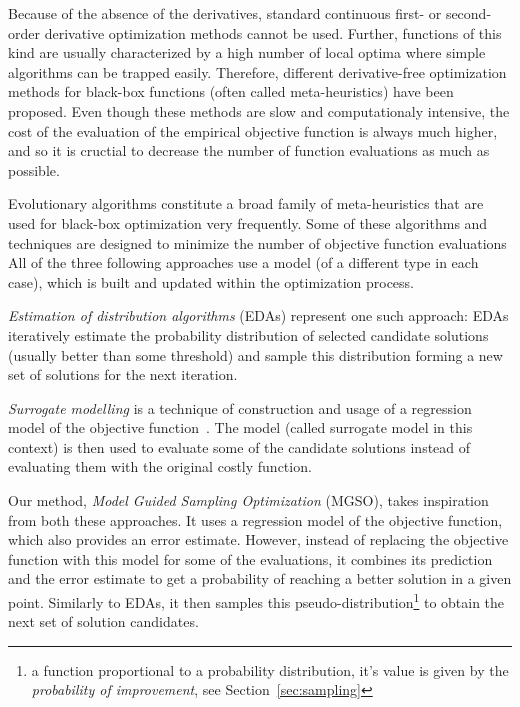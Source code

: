 \documentclass{itatnew}
\begin{document}
Because of the absence of the derivatives, standard continuous first- or second-order derivative optimization methods cannot be used. Further, functions of this kind are usually characterized by a high number of local optima where simple algorithms can be trapped easily. Therefore, different derivative-free optimization methods for black-box functions (often called meta-heuristics) have been proposed. Even though these methods are slow and computationaly intensive, the cost of the evaluation of the empirical objective function is always much higher, and so it is cructial to decrease the number of function evaluations as much as possible.

Evolutionary algorithms constitute a broad family of meta-heuristics that are used for black-box optimization very frequently. Some of these algorithms and techniques are designed to minimize the number of objective function evaluations 
All of the three following approaches use a model (of a different type in each case), which is built and updated within the optimization process.

\emph{Estimation of distribution algorithms} (EDAs) \cite{larranaga_estimation_2002} represent one such approach: EDAs iteratively estimate the probability distribution of selected candidate solutions (usually better than some threshold) and sample this distribution forming a new set of solutions for the next iteration. 

\emph{Surrogate modelling} is a technique of construction and usage of a regression model of the objective function~\cite{jin_comprehensive_2005}. The model (called surrogate model in this context) is then used to evaluate some of the candidate solutions instead of evaluating them with the original costly function.

Our method, \emph{Model Guided Sampling Optimization} (MGSO), takes inspiration from both these approaches. It uses a regression model of the objective function, which also provides an error estimate. However, instead of replacing the objective function with this model for some of the evaluations, it combines its prediction and the error estimate to get a probability of reaching a better solution in a given point. Similarly to EDAs, it then samples this pseudo-distribution\footnote{a function proportional to a probability distribution, it's value is given by the \emph{probability of improvement}, see Section~\ref{sec:sampling}} to obtain the next set of solution candidates.
\end{document}
